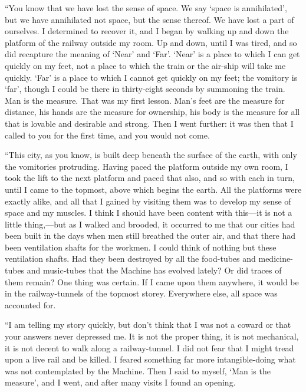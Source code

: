 ``You know that we have lost the sense of space. We say `space is annihilated', but we have annihilated not space, but the sense thereof. We have lost a part of ourselves. I determined to recover it, and I began by walking up and down the platform of the railway outside my room. Up and down, until I was tired, and so did recapture the meaning of `Near' and `Far'. `Near' is a place to which I can get quickly on my feet, not a place to which the train or the air-ship will take me quickly. `Far' is a place to which I cannot get quickly on my feet; the vomitory is `far', though I could be there in thirty-eight seconds by summoning the train. Man is the measure. That was my first lesson. Man's feet are the measure for distance, his hands are the measure for ownership, his body is the measure for all that is lovable and desirable and strong. Then I went further: it was then that I called to you for the first time, and you would not come.

``This city, as you know, is built deep beneath the surface of the earth, with only the vomitories protruding. Having paced the platform outside my own room, I took the lift to the next platform and paced that also, and so with each in turn, until I came to the topmost, above which begins the earth. All the platforms were exactly alike, and all that I gained by visiting them was to develop my sense of space and my muscles. I think I should have been content with this---it is not a little thing,---but as I walked and brooded, it occurred to me that our cities had been built in the days when men still breathed the outer air, and that there had been ventilation shafts for the workmen. I could think of nothing but these ventilation shafts. Had they been destroyed by all the food-tubes and medicine-tubes and music-tubes that the Machine has evolved lately? Or did traces of them remain? One thing was certain. If I came upon them anywhere, it would be in the railway-tunnels of the topmost storey. Everywhere else, all space was accounted for.%

``I am telling my story quickly, but don't think that I was not a coward or that your answers never depressed me. It is not the proper thing, it is not mechanical, it is not decent to walk along a railway-tunnel. I did not fear that I might tread upon a live rail and be killed. I feared something far more intangible-doing what was not contemplated by the Machine. Then I said to myself, `Man is the measure', and I went, and after many visits I found an opening.

